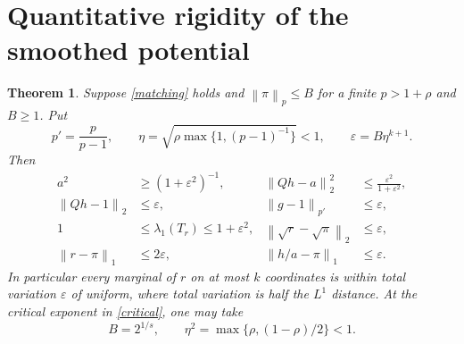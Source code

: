 \documentclass[11pt]{article}
\newtheorem{theorem}{Theorem}
\newcommand{\norm}[1]{\left\|#1\right\|}
\begin{document}
\section{Quantitative rigidity of the smoothed potential}
\begin{theorem}\label{rigidity}
Suppose \eqref{matching} holds and $\norm\pi_p\leq B$ for a finite $p>1+\rho$ and $B\geq1$. Put
\[
 p'=\frac p{p-1},\qquad
 \eta=\sqrt{\rho\max\{1,(p-1)^{-1}\}}<1,\qquad
 \varepsilon=B\eta^{k+1}.
\]
Then
\begin{align}
 a^2&\geq(1+\varepsilon^2)^{-1},&
 \norm{Qh-a}_2^2&\leq\frac{\varepsilon^2}{1+\varepsilon^2},\label{rig1}\\
 \norm{Qh-1}_2&\leq\varepsilon,& \norm{g-1}_{p'}&\leq\varepsilon,\label{rig2}\\
 1&\leq\lambda_1(T_r)\leq1+\varepsilon^2,&
 \norm{\sqrt r-\sqrt\pi}_2&\leq\varepsilon,\label{rig3}\\
 \norm{r-\pi}_1&\leq2\varepsilon,&
 \norm{h/a-\pi}_1&\leq\varepsilon.\label{rig4}
\end{align}
In particular every marginal of $r$ on at most $k$ coordinates is within total variation $\varepsilon$ of uniform, where total variation is half the $L^1$ distance. At the critical exponent in \eqref{critical}, one may take
\begin{equation}\label{criticalconstants}
 B=2^{1/s},\qquad \eta^2=\max\{\rho,(1-\rho)/2\}<1.
\end{equation}
\end{theorem}
\end{document}
